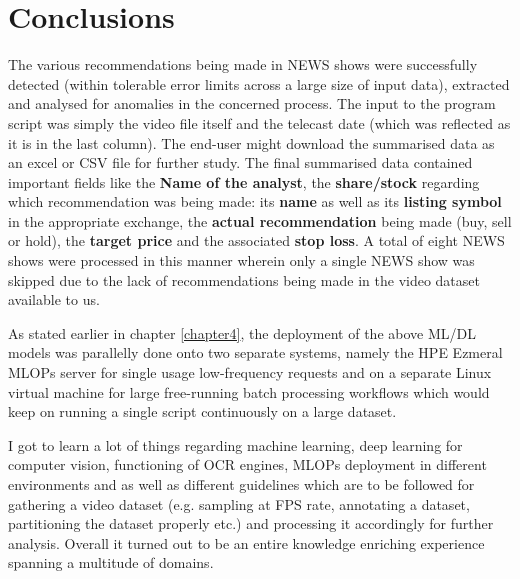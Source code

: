 \chapter{Conclusions} \label{chapter6}

The various recommendations being made in NEWS shows were
successfully detected (within tolerable error limits across a large
size of input data), extracted and analysed for anomalies in the
concerned process.  The input to the program script was simply the
video file itself and the telecast date (which was reflected as it is
in the last column). The end-user might download the summarised data
as an excel or CSV file for further study. The final summarised data
contained important fields like the \textbf{Name of the analyst}, the
\textbf{share/stock} regarding which recommendation was being made:
its \textbf{name} as well as its \textbf{listing symbol} in the
appropriate exchange, the \textbf{actual recommendation} being made
(buy, sell or hold), the \textbf{target price} and the associated
\textbf{stop loss}.  A total of eight NEWS shows were processed in
this manner wherein only a single NEWS show was skipped due to the
lack of recommendations being made in the video dataset available to us. \par

As stated earlier in chapter \ref{chapter4}, the deployment of the
above ML/DL models was parallelly done onto two separate systems,
namely the HPE Ezmeral MLOPs server for single usage low-frequency
requests and on a separate Linux virtual machine for large
free-running batch processing workflows which would keep on running a
single script continuously on a large dataset. \par

I got to learn a lot of things regarding machine learning, deep
learning for computer vision, functioning of OCR engines, MLOPs
deployment in different environments and as well as different
guidelines which are to be followed for gathering a video dataset
(e.g. sampling at FPS rate, annotating a dataset, partitioning the
dataset properly etc.) and processing it accordingly for further
analysis. Overall it turned out to be an entire knowledge enriching
experience spanning a multitude of domains.
